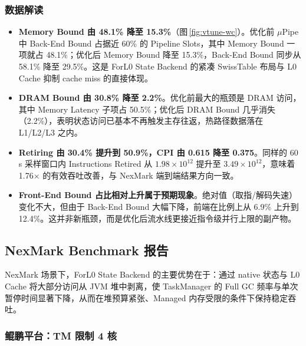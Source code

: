 \documentclass[a4paper,11pt]{article}
\newcommand{\project}{ForL0 State Backend}
\begin{document}
\subsubsection{数据解读}

\begin{itemize}
  \item \textbf{Memory Bound 由 48.1\% 降至 15.3\%}（图\,\ref{fig:vtune-wc}）。优化前 $\mu$Pipe 中 Back-End Bound 占据近 60\% 的 Pipeline Slots，其中 Memory Bound 一项就占 48.1\%；优化后 Memory Bound 降至 15.3\%，Back-End Bound 同步从 58.1\% 降至 29.5\%。这是 \project{} 的紧凑 SwissTable 布局与 L0 Cache 抑制 cache miss 的直接体现。
  \item \textbf{DRAM Bound 由 30.8\% 降至 2.2\%}。优化前最大的瓶颈是 DRAM 访问，其中 Memory Latency 子项占 50.5\%；优化后 DRAM Bound 几乎消失（2.2\%），表明状态访问已基本不再触发主存往返，热路径数据落在 L1/L2/L3 之内。
  \item \textbf{Retiring 由 30.4\% 提升到 50.9\%，CPI 由 0.615 降至 0.375}。同样的 60\,s 采样窗口内 Instructions Retired 从 $1.98\times 10^{12}$ 提升至 $3.49\times 10^{12}$，意味着 1.76$\times$ 的有效吞吐改善，与 NexMark 端到端结果方向一致。
  \item \textbf{Front-End Bound 占比相对上升属于预期现象}。绝对值（取指/解码失速）变化不大，但由于 Back-End Bound 大幅下降，前端在比例上从 6.9\% 上升到 12.4\%。这并非新瓶颈，而是优化后流水线更接近指令级并行上限的副产物。
\end{itemize}

\subsection{NexMark Benchmark 报告}

NexMark 场景下，\project{} 的主要优势在于：通过 native 状态与 L0 Cache 将大部分访问从 JVM 堆中剥离，使 TaskManager 的 Full GC 频率与单次暂停时间显著下降，从而在堆预算紧张、Managed 内存受限的条件下保持稳定吞吐。

\subsubsection{鲲鹏平台：TM 限制 4 核}
\end{document}
